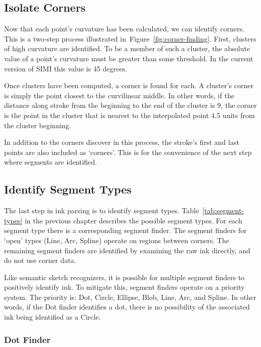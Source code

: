 \subsection{Isolate Corners}

Now that each point's curvature has been calculated, we can identify
corners. This is a two-step process illustrated
in~Figure~\ref{fig:corner-finding}. First, clusters of high curvature
are identified. To be a member of such a cluster, the absolute value
of a point's curvature must be greater than some threshold. In the
current version of SIMI this value is 45 degrees.



Once clusters have been computed, a corner is found for each. A
cluster's corner is simply the point closest to the curvilinear
middle. In other words, if the distance along stroke from the
beginning to the end of the cluster is 9, the corner is the point in
the cluster that is nearest to the interpolated point 4.5 units from
the cluster beginning. 

In addition to the corners discover in this process, the stroke's
first and last points are also included as `corners'. This is for the
convenience of the next step where segments are identified.

\subsection{Identify Segment Types}

The last step in ink parsing is to identify segment
types. Table~\ref{tab:segment-types} in the previous chapter describes
the possible segment types. For each segment type there is a
corresponding segment finder. The segment finders for `open' types
(Line, Arc, Spline) operate on regions between corners. The remaining
segment finders are identified by examining the raw ink directly, and
do not use corner data.

Like semantic sketch recognizers, it is possible for multiple segment
finders to positively identify ink. To mitigate this, segment finders
operate on a priority system. The priority is: Dot, Circle, Ellipse,
Blob, Line, Arc, and Spline. In other words, if the Dot finder
identifies a dot, there is no possibility of the associated ink being
identified as a Circle.

\subsubsection{Dot Finder}

